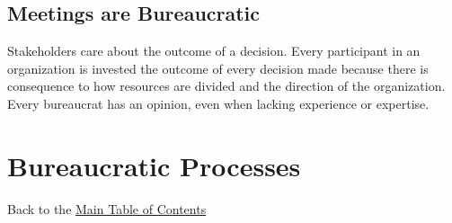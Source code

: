 \documentclass{book}
\begin{document}
 \clearpage %
     \clearpage %
     \clearpage %
     \clearpage %
     \clearpage %
     \clearpage %
     \clearpage 
    

    \section{Meetings are Bureaucratic\label{sec:meetings}}
    Stakeholders care about the outcome of a decision. 
    Every participant in an organization is invested the outcome of every decision made because there is consequence to how resources are divided and the direction of the organization. Every bureaucrat has an opinion, even when lacking experience or expertise. 
    
        
         
         
         
         
        
    

  \chapter{Bureaucratic Processes\label{sec:process}}
  {\footnotesize Back to the \hyperref[sec:toc]{Main Table of Contents}}
  \minitoc
     \clearpage
     \clearpage
     \clearpage
     \clearpage
     \clearpage
     \clearpage
     \clearpage
     \clearpage
     \clearpage
    \clearpage
     \clearpage


\end{document}
